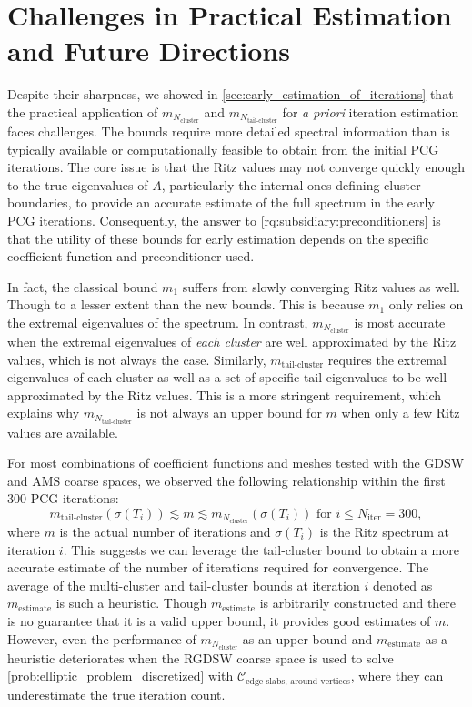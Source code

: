 \section{Challenges in Practical Estimation and Future Directions}
Despite their sharpness, we showed in \cref{sec:early_estimation_of_iterations} that the practical application of $m_{N_{\text{cluster}}}$ and $m_{N_{\text{tail-cluster}}}$ for \textit{a priori} iteration estimation faces challenges. The bounds require more detailed spectral information than is typically available or computationally feasible to obtain from the initial PCG iterations. The core issue is that the Ritz values may not converge quickly enough to the true eigenvalues of $A$, particularly the internal ones defining cluster boundaries, to provide an accurate estimate of the full spectrum in the early PCG iterations. Consequently, the answer to \ref{rq:subsidiary:preconditioners} is that the utility of these bounds for early estimation depends on the specific coefficient function and preconditioner used.

In fact, the classical bound $m_1$ suffers from slowly converging Ritz values as well. Though to a lesser extent than the new bounds. This is because $m_1$ only relies on the extremal eigenvalues of the spectrum. In contrast, $m_{N_{\text{cluster}}}$ is most accurate when the extremal eigenvalues of \textit{each cluster} are well approximated by the Ritz values, which is not always the case. Similarly, $m_{\text{tail-cluster}}$ requires the extremal eigenvalues of each cluster as well as a set of specific tail eigenvalues to be well approximated by the Ritz values. This is a more stringent requirement, which explains why $m_{N_{\text{tail-cluster}}}$ is not always an upper bound for $m$ when only a few Ritz values are available.

For most combinations of coefficient functions and meshes tested with the GDSW and AMS coarse spaces, we observed the following relationship within the first 300 PCG iterations:
\[
    m_{\text{tail-cluster}}(\sigma(T_i)) \lesssim m \lesssim m_{N_{\text{cluster}}}(\sigma(T_i)) \text{ for } i \leq N_{\text{iter}} = 300,
\]
where $m$ is the actual number of iterations and $\sigma(T_i)$ is the Ritz spectrum at iteration $i$. This suggests we can leverage the tail-cluster bound to obtain a more accurate estimate of the number of iterations required for convergence. The average of the multi-cluster and tail-cluster bounds at iteration $i$ denoted as $m_{\text{estimate}}$ is such a heuristic. Though $m_{\text{estimate}}$ is arbitrarily constructed and there is no guarantee that it is a valid upper bound, it provides good estimates of $m$. However, even the performance of $m_{N_{\text{cluster}}}$ as an upper bound and $m_{\text{estimate}}$ as a heuristic deteriorates when the RGDSW coarse space is used to solve \cref{prob:elliptic_problem_discretized} with $\mathcal{C}_{\text{edge slabs, around vertices}}$, where they can underestimate the true iteration count.

